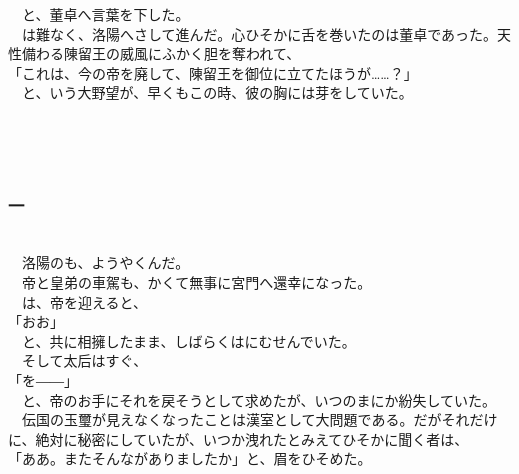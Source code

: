 \documentclass[
  paper=a5,
  fontsize=10pt,
  jafontsize=9.5pt,
  tate,                  %
  open_bracket_pos=nibu, %
]{jlreq}
\begin{document}
　と、董卓へ言葉を下した。\\


　は難なく、洛陽へさして進んだ。心ひそかに舌を巻いたのは董卓であった。天性備わる陳留王の威風にふかく胆を奪われて、\\


「これは、今の帝を廃して、陳留王を御位に立てたほうが……？」\\


　と、いう大野望が、早くもこの時、彼の胸には芽をしていた。\\

\\

\subsection{}

\\

\subsubsection{一}

\\


　洛陽のも、ようやくんだ。\\


　帝と皇弟の車駕も、かくて無事に宮門へ還幸になった。\\


　は、帝を迎えると、\\


「おお」\\


　と、共に相擁したまま、しばらくはにむせんでいた。\\


　そして太后はすぐ、\\


「を――」\\


　と、帝のお手にそれを戻そうとして求めたが、いつのまにか紛失していた。\\


　伝国の玉璽が見えなくなったことは漢室として大問題である。だがそれだけに、絶対に秘密にしていたが、いつか洩れたとみえてひそかに聞く者は、\\


「ああ。またそんながありましたか」と、眉をひそめた。\\
\end{document}
